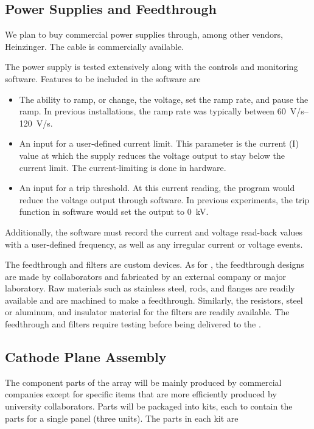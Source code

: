 \subsection{Power Supplies and Feedthrough}
\label{sec:fdsp-hv-supplies-feedthrough}

We plan to buy commercial power supplies through, among other vendors, Heinzinger. 
The  cable is commercially available.

The power supply is tested extensively along with the controls and monitoring software.  Features to be included in the software are
\begin{itemize}
\item The ability to ramp, or change, the voltage, set the ramp rate, and pause the ramp. %
In previous installations, the ramp rate was typically between \SIrange{60}{120}{V/s}.
\item An input for a user-defined current limit.  This parameter is the current (I) value at which the supply reduces the voltage output to stay below the current limit.  The current-limiting is done in hardware.
\item An input for a trip threshold.  At this current reading, the program would reduce the voltage output through software.  In previous experiments, the trip function in software would set the output to \SI{0}{kV}.
\end{itemize}
Additionally, the software must
record the current and voltage read-back values with a user-defined frequency, as well as any irregular current or voltage events.



The  feedthrough and filters are custom devices. As for , the feedthrough  designs are made by collaborators and fabricated by an external company or major laboratory.
 Raw materials such as stainless steel,  rods, and flanges are readily available and are machined to make a feedthrough. Similarly, the resistors, steel or aluminum, and insulator material for the filters are readily available. The feedthrough and filters require testing before being delivered to the . %
 
\subsection{Cathode Plane Assembly}
\label{sec:fdsp-hv-prod-cpa}
 The component parts of the  array will be mainly produced by commercial companies except for specific items that are more efficiently produced by university collaborators.  Parts will be packaged into kits, each to contain the parts for a single  panel
(three  units). The parts in each kit are

